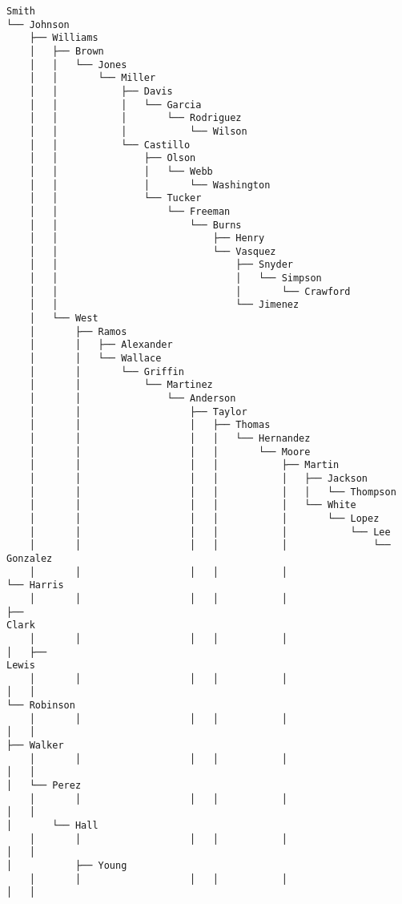 \documentclass[11pt]{article}
\begin{document}
    \begin{Verbatim}[commandchars=\\\{\}]
Smith
└── Johnson
    ├── Williams
    │   ├── Brown
    │   │   └── Jones
    │   │       └── Miller
    │   │           ├── Davis
    │   │           │   └── Garcia
    │   │           │       └── Rodriguez
    │   │           │           └── Wilson
    │   │           └── Castillo
    │   │               ├── Olson
    │   │               │   └── Webb
    │   │               │       └── Washington
    │   │               └── Tucker
    │   │                   └── Freeman
    │   │                       └── Burns
    │   │                           ├── Henry
    │   │                           └── Vasquez
    │   │                               ├── Snyder
    │   │                               │   └── Simpson
    │   │                               │       └── Crawford
    │   │                               └── Jimenez
    │   └── West
    │       ├── Ramos
    │       │   ├── Alexander
    │       │   └── Wallace
    │       │       └── Griffin
    │       │           └── Martinez
    │       │               └── Anderson
    │       │                   ├── Taylor
    │       │                   │   ├── Thomas
    │       │                   │   │   └── Hernandez
    │       │                   │   │       └── Moore
    │       │                   │   │           ├── Martin
    │       │                   │   │           │   ├── Jackson
    │       │                   │   │           │   │   └── Thompson
    │       │                   │   │           │   └── White
    │       │                   │   │           │       └── Lopez
    │       │                   │   │           │           └── Lee
    │       │                   │   │           │               └── Gonzalez
    │       │                   │   │           │                   └── Harris
    │       │                   │   │           │                       ├──
Clark
    │       │                   │   │           │                       │   ├──
Lewis
    │       │                   │   │           │                       │   │
└── Robinson
    │       │                   │   │           │                       │   │
├── Walker
    │       │                   │   │           │                       │   │
│   └── Perez
    │       │                   │   │           │                       │   │
│       └── Hall
    │       │                   │   │           │                       │   │
│           ├── Young
    │       │                   │   │           │                       │   │

\end{Verbatim}
\end{document}
